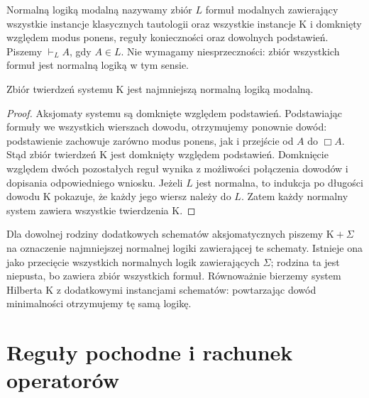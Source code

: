 \begin{definicja}
\label{def:ncl-modal-normal-logic}
Normalną logiką modalną nazywamy zbiór $L$
formuł modalnych zawierający wszystkie instancje
klasycznych tautologii oraz wszystkie instancje K i domknięty
względem modus ponens, reguły konieczności
oraz dowolnych podstawień.
Piszemy $\vdash_L A$, gdy $A\in L$.
Nie wymagamy niesprzeczności: zbiór wszystkich
formuł jest normalną logiką w tym sensie.
\end{definicja}

\begin{stwierdzenie}
\label{prop:ncl-modal-K-minimal}
Zbiór twierdzeń systemu $\mathrm K$ jest najmniejszą
normalną logiką modalną.
\end{stwierdzenie}
\begin{proof}
Aksjomaty systemu są domknięte względem podstawień.
Podstawiając formuły we wszystkich wierszach dowodu,
otrzymujemy ponownie dowód: podstawienie zachowuje
zarówno modus ponens, jak i przejście od $A$ do
$\Box A$. Stąd zbiór twierdzeń K jest domknięty
względem podstawień. Domknięcie względem dwóch
pozostałych reguł wynika z możliwości połączenia
dowodów i dopisania odpowiedniego wniosku.
Jeżeli $L$ jest normalna, to indukcja po długości
dowodu K pokazuje, że każdy jego wiersz należy
do $L$. Zatem każdy normalny system zawiera
wszystkie twierdzenia K.
\end{proof}
Dla dowolnej rodziny dodatkowych schematów
aksjomatycznych piszemy $\mathrm K+\Sigma$ na
oznaczenie najmniejszej normalnej logiki
zawierającej te schematy. Istnieje ona jako
przecięcie wszystkich normalnych logik
zawierających $\Sigma$; rodzina ta jest niepusta,
bo zawiera zbiór wszystkich formuł.
Równoważnie bierzemy system Hilberta K
z dodatkowymi instancjami schematów: powtarzając
dowód minimalności otrzymujemy tę samą logikę.

\section{Reguły pochodne i rachunek operatorów}

